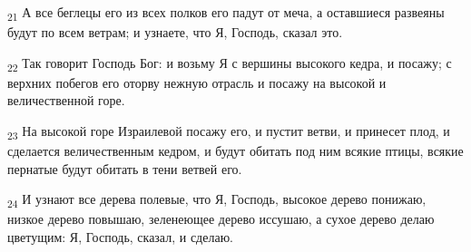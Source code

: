 \begin{tcolorbox}
\textsubscript{21} А все беглецы его из всех полков его падут от меча, а оставшиеся развеяны будут по всем ветрам; и узнаете, что Я, Господь, сказал это.
\end{tcolorbox}
\begin{tcolorbox}
\textsubscript{22} Так говорит Господь Бог: и возьму Я с вершины высокого кедра, и посажу; с верхних побегов его оторву нежную отрасль и посажу на высокой и величественной горе.
\end{tcolorbox}
\begin{tcolorbox}
\textsubscript{23} На высокой горе Израилевой посажу его, и пустит ветви, и принесет плод, и сделается величественным кедром, и будут обитать под ним всякие птицы, всякие пернатые будут обитать в тени ветвей его.
\end{tcolorbox}
\begin{tcolorbox}
\textsubscript{24} И узнают все дерева полевые, что Я, Господь, высокое дерево понижаю, низкое дерево повышаю, зеленеющее дерево иссушаю, а сухое дерево делаю цветущим: Я, Господь, сказал, и сделаю.
\end{tcolorbox}
